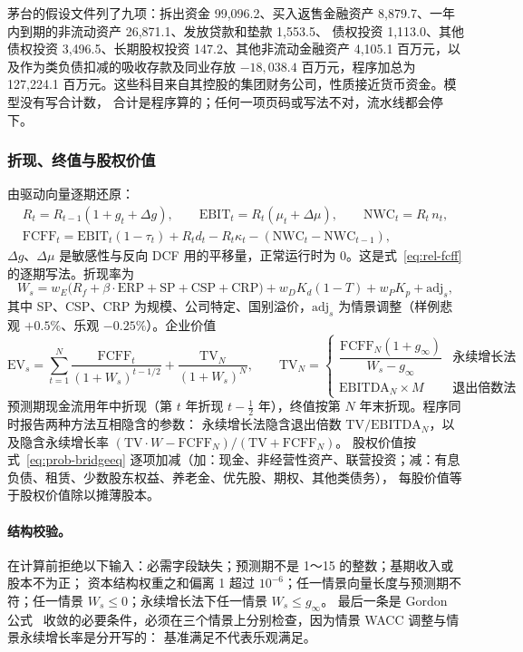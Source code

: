 茅台的假设文件列了九项：拆出资金 99,096.2、买入返售金融资产 8,879.7、一年内到期的非流动资产 26,871.1、发放贷款和垫款 1,553.5、
债权投资 1,113.0、其他债权投资 3,496.5、长期股权投资 147.2、其他非流动金融资产 4,105.1 百万元，以及作为类负债扣减的吸收存款及同业存放
$-18{,}038.4$ 百万元，程序加总为 127,224.1 百万元。这些科目来自其控股的集团财务公司，性质接近货币资金。模型没有写合计数，
合计是程序算的；任何一项页码或写法不对，流水线都会停下。

\subsubsection{折现、终值与股权价值}

 由驱动向量逐期还原：
\begin{gather}
R_t=R_{t-1}(1+g_t+\Delta g),\qquad \text{EBIT}_t=R_t(\mu_t+\Delta\mu),\qquad \text{NWC}_t=R_t\,n_t,\nonumber\\
\text{FCFF}_t=\text{EBIT}_t(1-\tau_t)+R_t d_t-R_t\kappa_t-(\text{NWC}_t-\text{NWC}_{t-1}), \label{eq:val-fcff}
\end{gather}
$\Delta g$、$\Delta\mu$ 是敏感性与反向 DCF 用的平移量，正常运行时为 0。这是式~\eqref{eq:rel-fcff} 的逐期写法。折现率为
\begin{equation}
W_s=w_E\big(R_f+\beta\cdot\text{ERP}+\text{SP}+\text{CSP}+\text{CRP}\big)+w_D K_d(1-T)+w_P K_p+\text{adj}_s ,
\label{eq:val-wacc}
\end{equation}
其中 SP、CSP、CRP 为规模、公司特定、国别溢价，$\text{adj}_s$ 为情景调整（样例悲观 $+0.5\%$、乐观 $-0.25\%$）。企业价值
\begin{equation}
\text{EV}_s=\sum_{t=1}^{N}\frac{\text{FCFF}_t}{(1+W_s)^{t-1/2}}+\frac{\text{TV}_N}{(1+W_s)^{N}},\qquad
\text{TV}_N=\begin{cases}\dfrac{\text{FCFF}_N(1+g_\infty)}{W_s-g_\infty} & \text{永续增长法}\\[6pt] \text{EBITDA}_N\times M & \text{退出倍数法}\end{cases}
\label{eq:val-ev}
\end{equation}
预测期现金流用年中折现（第 $t$ 年折现 $t-\tfrac12$ 年），终值按第 $N$ 年末折现。程序同时报告两种方法互相隐含的参数：
永续增长法隐含退出倍数 $\text{TV}/\text{EBITDA}_N$，以及隐含永续增长率 $(\text{TV}\cdot W-\text{FCFF}_N)/(\text{TV}+\text{FCFF}_N)$。
股权价值按式~\eqref{eq:prob-bridgeeq} 逐项加减（加：现金、非经营性资产、联营投资；减：有息负债、租赁、少数股东权益、养老金、优先股、期权、其他类债务），
每股价值等于股权价值除以摊薄股本。

\paragraph{结构校验。}  在计算前拒绝以下输入：必需字段缺失；预测期不是 1～15 的整数；基期收入或股本不为正；
资本结构权重之和偏离 1 超过 $10^{-6}$；任一情景向量长度与预测期不符；任一情景 $W_s\le0$；永续增长法下任一情景 $W_s\le g_\infty$。
最后一条是 Gordon 公式~\cite{gordon1959dividends} 收敛的必要条件，必须在三个情景上分别检查，因为情景 WACC 调整与情景永续增长率是分开写的：
基准满足不代表乐观满足。

